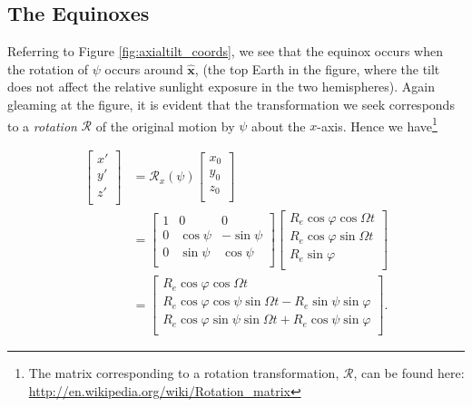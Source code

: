 \documentclass[10pt]{article}
\begin{document}
\subsection{The Equinoxes}

Referring to Figure \ref{fig:axialtilt_coords}, we see that the equinox occurs when the rotation of $\psi$ occurs around $\mathbf{\hat{x}}$, (the top Earth in the figure, where the tilt does not affect the relative sunlight exposure in the two hemispheres). 
Again gleaming at the figure, it is evident that the transformation we seek corresponds to a \emph{rotation} $\mathcal{R}$ of the original motion by $\psi$ about the $x$-axis. Hence we have\footnote{The matrix corresponding to a rotation transformation, $\mathcal{R}$, can be found here: \url{http://en.wikipedia.org/wiki/Rotation_matrix}}

\begin{align}
\left[ \begin{array}{c}
	x' \\
	y' \\
	z' \\
\end{array} \right] 
&=  \mathcal{R}_x (\psi)
\left[ \begin{array}{c}
	x_0 \\
	y_0 \\
	z_0 \\
\end{array} \right] \nonumber \\[0.6em] 
&=
\left[ \begin{array}{ccc}
	1 & 0 & 0 \\
	0 & \cos \psi & - \sin \psi \\
	0 & \sin \psi & \cos \psi \\
\end{array} \right]
\left[ \begin{array}{ccc}
	R_e \cos \varphi \cos \Omega t \\
	R_e \cos \varphi \sin \Omega t\\
	R_e \sin \varphi \\
\end{array} \right] \nonumber \\[0.6em]
&=
\left[ \begin{array}{c}
	R_e \cos \varphi \cos \Omega t \\
	R_e \cos \varphi \cos \psi \sin \Omega t - R_e \sin \psi \sin \varphi \\
	R_e \cos \varphi \sin \psi \sin \Omega t + R_e \cos \psi \sin \varphi \\
\end{array} \right].
\end{align}
\end{document}
